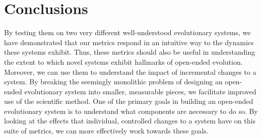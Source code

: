 \documentclass[letterpaper]{article}
\begin{document}
\section{Conclusions}
By testing them on two very different well-understood evolutionary systems, we have demonstrated that our metrics respond in an intuitive way to the dynamics these systems exhibit. Thus, these metrics should also be useful in understanding the extent to which novel systems exhibit hallmarks of open-ended evolution. Moreover, we can use them to understand the impact of incremental changes to a system. By breaking the seemingly monolithic problem of designing an open-ended evolutionary system into smaller, measurable pieces, we facilitate improved use of the scientific method. One of the primary goals in building an open-ended evolutionary system is to understand what components are necessary to do so. By looking at the effects that individual, controlled changes to a system have on this suite of metrics, we can more effectively work towards these goals.



\end{document}
